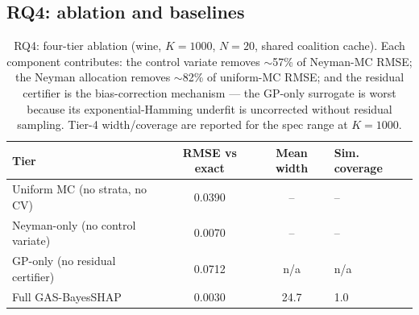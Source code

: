 \documentclass[11pt,twocolumn]{article}
\begin{document}
\subsection{RQ4: ablation and baselines}\label{sec:rq4}
\begin{table}[t]\centering\small
\begin{tabular}{lccl}
\toprule
Tier & RMSE vs exact & Mean width & Sim. coverage \\
\midrule
Uniform MC (no strata, no CV) & 0.0390 & -- & -- \\
Neyman-only (no control variate) & 0.0070 & -- & -- \\
GP-only (no residual certifier) & 0.0712 & n/a & n/a \\
Full GAS-BayesSHAP & $\mathbf{0.0030}$ & 24.7 & 1.0 \\
\bottomrule
\end{tabular}
\caption{RQ4: four-tier ablation (wine, $K{=}1000$, $N{=}20$, shared coalition
cache).  Each component contributes: the control variate removes
$\sim$57\% of Neyman-MC RMSE; the Neyman allocation removes $\sim$82\% of
uniform-MC RMSE; and the residual certifier is the bias-correction
mechanism — the GP-only surrogate is worst because its exponential-Hamming
underfit is uncorrected without residual sampling.  Tier-4 width/coverage
are reported for the spec range at $K{=}1000$.}
\label{rq4}
\end{table}
\end{document}
